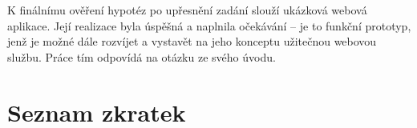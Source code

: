 \documentclass[12pt,oneside,final]{fithesis2}
\begin{document}
K finálnímu ověření hypotéz po upřesnění zadání slouží ukázková webová aplikace. Její realizace byla úspěšná a naplnila očekávání -- je to funkční prototyp, jenž je možné dále rozvíjet a vystavět na jeho konceptu užitečnou webovou službu. Práce tím odpovídá na otázku ze svého úvodu.




\begin{flushleft}
\end{flushleft}



\appendix
\chapter{Seznam zkratek}\label{abbrs}
\end{document}
